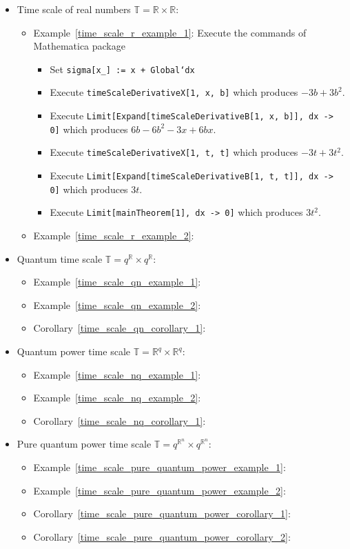 \begin{itemize}
\begin{itemize}
    \end{itemize}
    \item Time scale of real numbers $\mathbb{T} = \mathbb{R} \times \mathbb{R}$:
    \begin{itemize}
        \item Example~\ref{time_scale_r_example_1}:
        Execute the commands of Mathematica package
        \begin{itemize}
            \item Set \texttt{sigma[x\_] := x + Global`dx}
            \item Execute \texttt{timeScaleDerivativeX[1, x, b]} which produces $-3 b + 3 b^2$.
            \item Execute \texttt{Limit[Expand[timeScaleDerivativeB[1, x, b]], dx -> 0]}
            which produces $6 b - 6 b^2 - 3 x + 6 b x$.
            \item Execute \texttt{timeScaleDerivativeX[1, t, t]} which produces $-3 t + 3 t^2$.
            \item Execute \texttt{Limit[Expand[timeScaleDerivativeB[1, t, t]], dx -> 0]} which produces $3t$.
            \item Execute \texttt{Limit[mainTheorem[1], dx -> 0]} which produces $3t^2$.
        \end{itemize}
        \item Example~\ref{time_scale_r_example_2}:
    \end{itemize}
    \item Quantum time scale $\mathbb{T} = q^\mathbb{R} \times q^\mathbb{R}$:
    \begin{itemize}
        \item Example~\ref{time_scale_qn_example_1}:
        \item Example~\ref{time_scale_qn_example_2}:
        \item Corollary~\ref{time_scale_qn_corollary_1}:
    \end{itemize}
    \item Quantum power time scale $\mathbb{T} = \mathbb{R}^q \times \mathbb{R}^q$:
    \begin{itemize}
        \item Example~\ref{time_scale_nq_example_1}:
        \item Example~\ref{time_scale_nq_example_2}:
        \item Corollary~\ref{time_scale_nq_corollary_1}:
    \end{itemize}
    \item Pure quantum power time scale $\mathbb{T} = q^{\mathbb{R}^n} \times q^{\mathbb{R}^n}$:
    \begin{itemize}
        \item Example~\ref{time_scale_pure_quantum_power_example_1}:
        \item Example~\ref{time_scale_pure_quantum_power_example_2}:
        \item Corollary~\ref{time_scale_pure_quantum_power_corollary_1}:
        \item Corollary~\ref{time_scale_pure_quantum_power_corollary_2}:
    \end{itemize}
\end{itemize}

